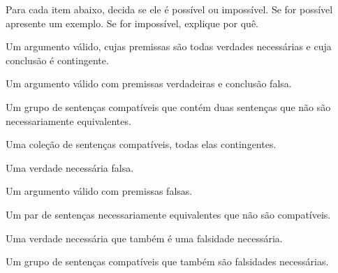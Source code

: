 \problempart
Para cada item abaixo, decida se ele é possível ou impossível.
Se for possível apresente um exemplo.
Se for impossível, explique por quê.
\begin{earg}
\item Um argumento válido, cujas premissas são todas verdades necessárias e cuja conclusão é contingente.
\item Um argumento válido com premissas verdadeiras e conclusão falsa.
\item Um grupo de sentenças compatíveis que contém duas sentenças que não são necessariamente equivalentes.
\item Uma coleção de sentenças compatíveis, todas elas contingentes.
\item Uma verdade necessária falsa.
\item Um argumento válido com premissas falsas.
\item Um par de sentenças necessariamente equivalentes que não são compatíveis.
\item Uma verdade necessária que também é uma falsidade necessária.
\item Um grupo de sentenças compatíveis que também são falsidades necessárias.
\end{earg}

